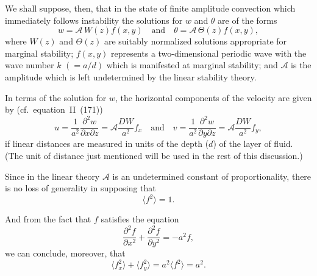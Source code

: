 We shall suppose, then, that in the state of finite amplitude convection which immediately follows instability the solutions for $w$ and $\theta$ are of the forms
\begin{equation}
\label{eq:A1-21}
w = \mathscr{A}\, W(z) f(x,y) \quad \text{and} \quad \theta = \mathscr{A}\,\Theta(z) f(x,y),
\end{equation}
where $W(z)$ and $\Theta(z)$ are suitably normalized solutions appropriate for marginal stability; $f(x,y)$ represents a two-dimensional periodic wave with the wave number $k$ $(= a/d)$ which is manifested at marginal stability; and $\mathscr{A}$ is the amplitude which is left undetermined by the linear stability theory.

In terms of the solution for $w$, the horizontal components of the velocity are given by (cf.\ equation~II~(171))
\begin{equation}
\label{eq:A1-22}
u = \frac{1}{a^2} \frac{\partial^2 w}{\partial x \partial z} = \mathscr{A} \frac{DW}{a^2} f_x \quad \text{and} \quad v = \frac{1}{a^2} \frac{\partial^2 w}{\partial y \partial z} = \mathscr{A} \frac{DW}{a^2} f_y,
\end{equation}
if linear distances are measured in units of the depth ($d$) of the layer of fluid. (The unit of distance just mentioned will be used in the rest of this discussion.)

Since in the linear theory $\mathscr{A}$ is an undetermined constant of proportionality, there is no loss of generality in supposing that
\begin{equation}
\label{eq:A1-23}
\langle f^2 \rangle = 1.
\end{equation}

And from the fact that $f$ satisfies the equation
\begin{equation}
\label{eq:A1-24}
\frac{\partial^2 f}{\partial x^2} + \frac{\partial^2 f}{\partial y^2} = -a^2 f,
\end{equation}
we can conclude, moreover, that
\begin{equation}
\label{eq:A1-25}
\langle f_x^2 \rangle + \langle f_y^2 \rangle = a^2 \langle f^2 \rangle = a^2.
\end{equation}

